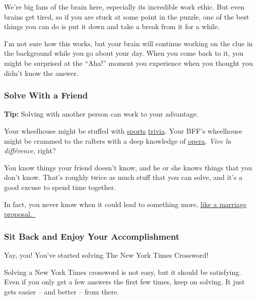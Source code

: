 We're big fans of the brain here, especially its incredible work ethic.
But even brains get tired, so if you are stuck at some point in the
puzzle, one of the best things you can do is put it down and take a
break from it for a while.~

I'm not sure how this works, but your brain will continue working on the
clue in the background while you go about your day. When you come back
to it, you might be surprised at the ``Aha!'' moment you experience when
you thought you didn't know the answer.

\hypertarget{solve-with-a-friend}{%
\subsubsection{Solve With a Friend}\label{solve-with-a-friend}}

\textbf{Tip:} Solving with another person can work to your advantage.~

Your wheelhouse might be stuffed with
\href{https://www.nytimes.com/interactive/2017/04/01/crosswords/CROSSWORDS-baseball-terms.html}{sports}
\href{https://www.nytimes.com/interactive/2017/04/19/crosswords/CROSSWORDS-sports-names.html}{trivia}.
Your BFF's wheelhouse might be crammed to the rafters with a deep
knowledge of
\href{https://www.nytimes.com/interactive/2017/07/19/crosswords/CROSSWORDS-operas.html?rref=collection\%2Fcolumn\%2Fwordplay}{opera}.
\emph{Vive la différence}, right?

You know things your friend doesn't know, and he or she knows things
that you don't know. That's roughly twice as much stuff that you can
solve, and it's a good excuse to spend time together.~

In fact, you never know when it could lead to something more,
\href{https://www.youtube.com/watch?v=73EDetVQzCs}{like a marriage
proposal.~}

\hypertarget{sit-back-and-enjoy-your-accomplishment}{%
\subsubsection{Sit Back and Enjoy Your
Accomplishment}\label{sit-back-and-enjoy-your-accomplishment}}

Yay, you! You've started solving The New York Times Crossword!~

Solving a New York Times crossword is not easy, but it should be
satisfying. Even if you only get a few answers the first few times, keep
on solving. It just gets easier -- and better -- from there.~

